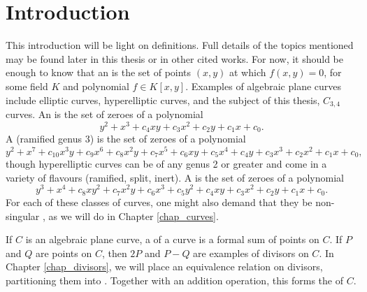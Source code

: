 

\section{Introduction}

This introduction will be light on definitions.
Full details of the topics mentioned may be found later in this thesis or in other cited works.
For now, it should be enough to know that an  is the set of points $(x,y)$
at which $f(x, y) = 0$, for some field $K$ and polynomial $f \in K[x,y]$.
Examples of algebraic plane curves include elliptic curves, hyperelliptic curves,
and the subject of this thesis, $C_{3,4}$ curves.
An  is the set of zeroes of a polynomial
\begin{equation}
  \label{eq_elliptic}
  y^2 + x^3 + c_4xy + c_3x^2 + c_2y + c_1x + c_0.
\end{equation}
A (ramified genus 3)  is the set of zeroes of a polynomial
\begin{equation}
  \label{eq_genus_3_hyperelliptic}
  y^2 + x^7 + c_{10}x^3y + c_9x^6 + c_8x^2y + c_7x^5 + c_6xy + c_5x^4 + c_4y + c_3x^3 + c_2x^2 + c_1x + c_0,
\end{equation}
though hyperelliptic curves can be of any genus 2 or greater and come in a variety of flavours (ramified, split, inert).
A  is the set of zeroes of a polynomial
\begin{equation}
  \label{eq_c34_intro}
  y^3 + x^4 + c_8xy^2 + c_7x^2y + c_6x^3 + c_5y^2 + c_4xy + c_3x^2 + c_2y + c_1x + c_0.
\end{equation}
For each of these classes of curves, one might also demand that they be non-singular
,
as we will do in Chapter \ref{chap_curves}.

If $C$ is an algebraic plane curve, a  of a curve is a formal sum of points on $C$.
If $P$ and $Q$ are points on $C$, then $2P$ and $P - Q$ are examples of divisors on $C$.
In Chapter \ref{chap_divisors}, we will place an equivalence relation on divisors,
partitioning them into .
Together with an addition operation, this forms the  of $C$.




